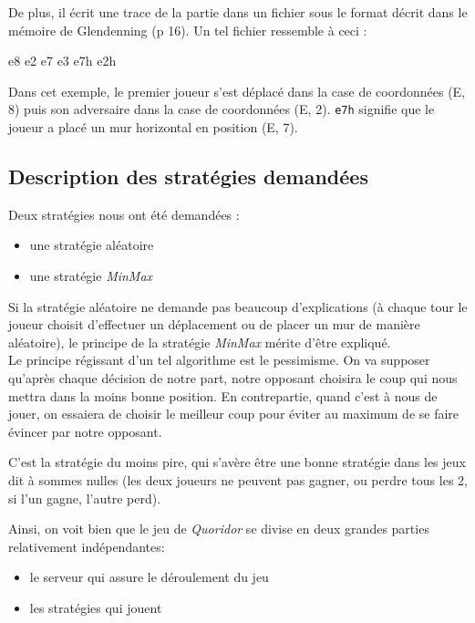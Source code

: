 \documentclass[12pt,a4paper]{article}
\begin{document}
De plus, il écrit une trace de la partie dans un fichier sous le 
format décrit dans le mémoire de Glendenning (p 16). Un tel fichier ressemble
à ceci :
\begin{verbatimtab}[2]
  e8 e2
  e7 e3
  e7h e2h
\end{verbatimtab}

Dans cet exemple, le premier joueur s'est déplacé dans la case de coordonnées (E, 8)
puis son adversaire dans la case de coordonnées (E, 2).
\verb,e7h, signifie que le joueur a placé un mur horizontal en position (E, 7).

\subsection{Description des stratégies demandées}

Deux stratégies nous ont été demandées :
\begin{itemize}
\item une stratégie aléatoire
\item une stratégie \textit{MinMax}\\
\end{itemize}

Si la stratégie aléatoire ne demande pas beaucoup d'explications (à chaque tour
le joueur choisit d'effectuer un déplacement ou de placer un mur de manière aléatoire), 
le principe de la stratégie \textit{MinMax} mérite d'\^etre expliqué.
\\

Le principe régissant d'un tel algorithme est le pessimisme.
On va supposer qu'après chaque décision de notre part, notre opposant choisira 
le coup qui nous mettra dans la moins bonne position. En contrepartie, quand 
c'est à nous de jouer, on essaiera de choisir le meilleur coup pour éviter 
au maximum de se faire évincer par notre opposant.

C'est la stratégie du moins pire, qui s'avère être une bonne stratégie dans les 
jeux dit \og à sommes nulles \fg{} (les deux joueurs ne peuvent pas gagner, ou perdre
tous les 2, si l'un gagne, l'autre perd). \\

\vspace{2cm}

Ainsi, on voit bien que le jeu de \textit{Quoridor} se divise en deux grandes parties 
relativement indépendantes: 
\begin{itemize}
\item le serveur qui assure le déroulement du jeu
\item les stratégies qui jouent
\end{itemize}
\end{document}
